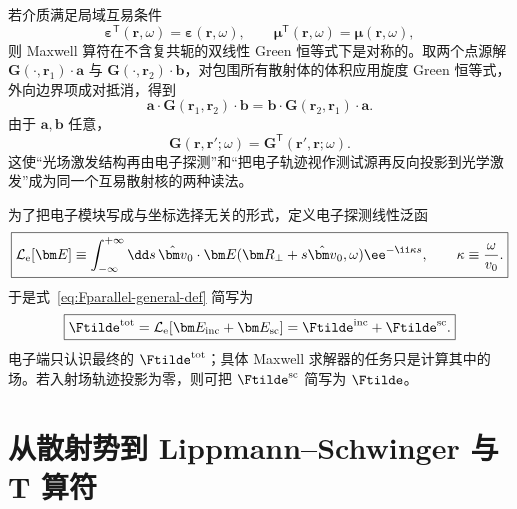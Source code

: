 若介质满足局域互易条件
\begin{equation}
 \boldsymbol\varepsilon^{\mathsf T}(\bm r,\omega)
 =\boldsymbol\varepsilon(\bm r,\omega),
 \qquad
 \boldsymbol\mu^{\mathsf T}(\bm r,\omega)
 =\boldsymbol\mu(\bm r,\omega),
 \label{eq:reciprocal-epsilon}
\end{equation}
则 Maxwell 算符在不含复共轭的双线性 Green 恒等式下是对称的。取两个点源解 $\mathbf G(\cdot,\bm r_1)\cdot\bm a$ 与
$\mathbf G(\cdot,\bm r_2)\cdot\bm b$，对包围所有散射体的体积应用旋度 Green 恒等式，外向边界项成对抵消，得到
\begin{equation}
 \bm a\cdot\mathbf G(\bm r_1,\bm r_2)\cdot\bm b
 =\bm b\cdot\mathbf G(\bm r_2,\bm r_1)\cdot\bm a.
\end{equation}
由于 $\bm a,\bm b$ 任意，
\begin{equation}
 \boxed{
 \mathbf G(\bm r,\bm r';\omega)
 =\mathbf G^{\mathsf T}(\bm r',\bm r;\omega).}
 \label{eq:green-reciprocity}
\end{equation}
这使“光场激发结构再由电子探测”和“把电子轨迹视作测试源再反向投影到光学激发”成为同一个互易散射核的两种读法。

为了把电子模块写成与坐标选择无关的形式，定义电子探测线性泛函
\begin{equation}
\boxed{
\mathcal L_{\rm e}[\bm E]
\equiv
\int_{-\infty}^{+\infty}\dd s\,
\hat{\bm v}_0\cdot
\bm E(\bm R_\perp+s\hat{\bm v}_0,\omega)
\ee^{-\ii\kappa s},
\qquad
\kappa\equiv\frac{\omega}{v_0}.}
\label{eq:electron-detection-functional}
\end{equation}
于是式~\eqref{eq:Fparallel-general-def} 简写为
\begin{equation}
\boxed{
\Ftilde^{\rm tot}=\mathcal L_{\rm e}[\bm E_{\rm inc}+\bm E_{\rm sc}]
=\Ftilde^{\rm inc}+\Ftilde^{\rm sc}.}
\label{eq:F-as-functional}
\end{equation}
电子端只认识最终的 $\Ftilde^{\rm tot}$；具体 Maxwell 求解器的任务只是计算其中的场。若入射场轨迹投影为零，则可把 $\Ftilde^{\rm sc}$ 简写为 $\Ftilde$。


\section{从散射势到 Lippmann--Schwinger 与 T 算符}

